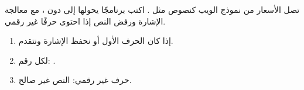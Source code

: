 \begin{statement}
تصل الأسعار من نموذج الويب كنصوص مثل . اكتب برنامجًا يحولها إلى  دون ، مع معالجة الإشارة ورفض النص إذا احتوى حرفًا غير رقمي.
\end{statement}
\begin{stepsbox}\begin{enumerate}
\item إذا كان الحرف الأول \code{-} أو \code{+} نحفظ الإشارة ونتقدم.
\item لكل رقم: .
\item حرف غير رقمي: النص غير صالح.
\end{enumerate}\end{stepsbox}
